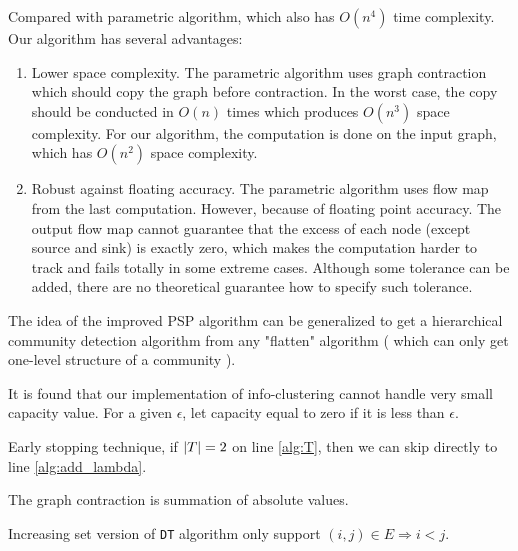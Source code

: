 \documentclass{article}
\begin{document}
Compared with parametric algorithm, which also has $O(n^4)$ time complexity. Our algorithm has several advantages:
\begin{enumerate}
	\item Lower space complexity. The parametric algorithm uses graph contraction which should copy the graph before contraction. In the worst case, the copy should be conducted in $O(n)$ times which produces $O(n^3)$ space complexity.
	For our algorithm, the computation is done on the input graph, which has $O(n^2)$ space complexity.
	\item Robust against floating accuracy. The parametric algorithm uses flow map from the last computation. However, because of floating point accuracy. The output flow map cannot guarantee that the excess of each node (except source and sink) is exactly zero, which makes the computation harder to track and fails totally in some extreme cases. Although some tolerance can be added, there are no theoretical guarantee how to specify such tolerance.
\end{enumerate}
The idea of the improved PSP algorithm can be generalized to get a hierarchical community detection algorithm from any "flatten" algorithm ( which can only get one-level structure of a community ).

It is found that our implementation of info-clustering cannot handle very small capacity value. For a given $\epsilon$, let capacity equal to zero if it is less than $\epsilon$.

Early stopping technique, if $\lvert T\rvert=2$ on line \ref{alg:T}, then we can skip directly to line \ref{alg:add_lambda}.

The graph contraction is summation of absolute values.

Increasing set version of  \texttt{DT} algorithm only support $(i,j) \in E \Rightarrow i<j$.
\end{document}

